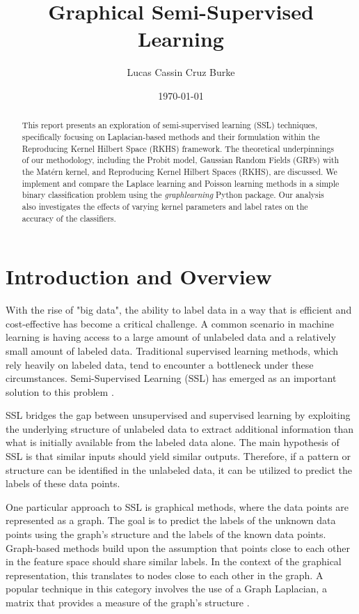 \documentclass[11pt]{amsart}
\title{Graphical Semi-Supervised Learning}
\author{Lucas Cassin Cruz Burke} %
\date{\today} %
\begin{document}
\maketitle 

\begin{abstract}
    This report presents an exploration of semi-supervised learning (SSL) techniques, specifically focusing on Laplacian-based methods and their formulation within the Reproducing Kernel Hilbert Space (RKHS) framework. The theoretical underpinnings of our methodology, including the Probit model, Gaussian Random Fields (GRFs) with the Matérn kernel, and Reproducing Kernel Hilbert Spaces (RKHS), are discussed. We implement and compare the Laplace learning and Poisson learning methods in a simple binary classification problem using the \textit{graphlearning} Python package. Our analysis also investigates the effects of varying kernel parameters and label rates on the accuracy of the classifiers. 
\end{abstract}

\section{Introduction and Overview}\label{sec:Introduction}

With the rise of "big data", the ability to label data in a way that is efficient and cost-effective has become a critical challenge. A common scenario in machine learning is having access to a large amount of unlabeled data and a relatively small amount of labeled data. Traditional supervised learning methods, which rely heavily on labeled data, tend to encounter a bottleneck under these circumstances. Semi-Supervised Learning (SSL) has emerged as an important solution to this problem \cite{zhu2005}.

SSL bridges the gap between unsupervised and supervised learning by exploiting the underlying structure of unlabeled data to extract additional information than what is initially available from the labeled data alone. The main hypothesis of SSL is that similar inputs should yield similar outputs. Therefore, if a pattern or structure can be identified in the unlabeled data, it can be utilized to predict the labels of these data points.

One particular approach to SSL is graphical methods, where the data points are represented as a graph. The goal is to predict the labels of the unknown data points using the graph's structure and the labels of the known data points. Graph-based methods build upon the assumption that points close to each other in the feature space should share similar labels. In the context of the graphical representation, this translates to nodes close to each other in the graph. A popular technique in this category involves the use of a Graph Laplacian, a matrix that provides a measure of the graph's structure \cite{amath563}.
\end{document}
